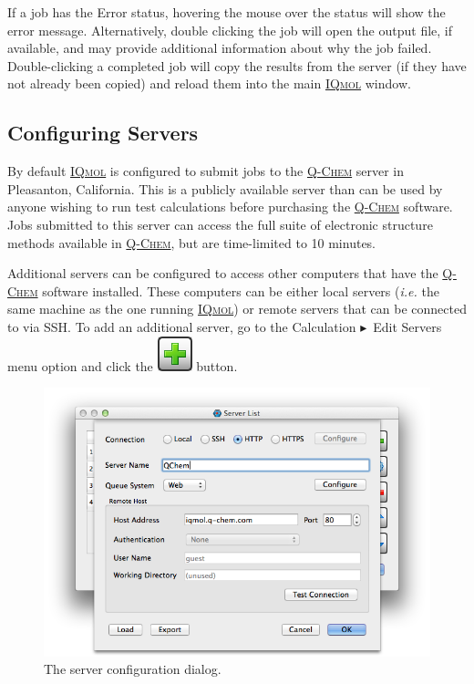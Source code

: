 \documentclass[a4paper,12pt]{article}
\newcommand{\qchem}{\href{http://q-chem.com}{{\scshape Q-Chem}}}
\newcommand{\iqmol}{\href{http://iqmol.org}{{\scshape IQmol}}}
\newcommand{\bt}{\ensuremath{\blacktriangleright}}
\begin{document}
If a job has the Error status, hovering the mouse over the status will show the
error message.  Alternatively, double clicking the job will open the output
file, if available, and may provide additional information about why the job
failed.  Double-clicking a completed job will copy the results from the
server (if they have not already been copied) and reload them into the main
\iqmol{} window.


\subsection{Configuring Servers}

By default \iqmol{} is configured to submit jobs to the \qchem{} server in
Pleasanton, California.  This is a publicly available server than can be used
by anyone wishing to run test calculations before purchasing the \qchem{}
software.  Jobs submitted to this server can access the full suite of
electronic structure methods available in \qchem{}, but are time-limited to 10
minutes. 

Additional servers can be configured to access other computers that have the
\qchem{} software installed.  These computers can be either local servers
(\emph{i.e.} the same machine as the one running \iqmol{}) or remote servers
that can be connected to via SSH.  To add an additional server, go to the
Calculation \bt\ Edit Servers menu option and click the
\includegraphics[scale=0.40]{figures/PlusButton.png} button.  
\begin{figure}
\begin{center}
\includegraphics[scale=0.5]{figures/ServerDialog.png}
\caption{The server configuration dialog.}
\end{center}
\end{figure}
\end{document}
